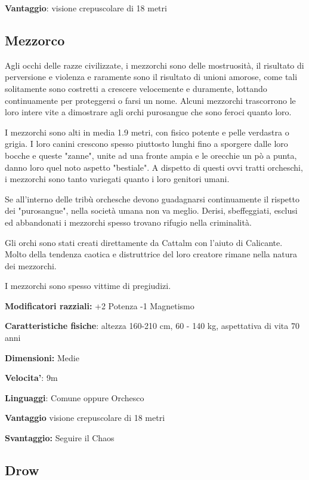 \documentclass[a4paper,11pt,twoside,openany]{book}
\begin{document}
\textbf{Vantaggio}: visione crepuscolare di 18 metri


\subsection{Mezzorco}

\label{mezzorco}

Agli occhi delle razze civilizzate, i mezzorchi sono delle mostruosità, il risultato di perversione e violenza e raramente sono il risultato di unioni amorose, come tali solitamente sono costretti a crescere velocemente e duramente, lottando continuamente per proteggersi o farsi un nome. Alcuni mezzorchi trascorrono le loro intere vite a dimostrare agli orchi purosangue che sono feroci quanto loro.

I mezzorchi sono alti in media 1.9 metri, con fisico potente e pelle verdastra o grigia. I loro canini crescono spesso piuttosto lunghi fino a sporgere dalle loro bocche e queste "zanne", unite ad una fronte ampia e le orecchie un pò a punta, danno loro quel noto aspetto "bestiale". A dispetto di questi ovvi tratti orcheschi, i mezzorchi sono tanto variegati quanto i loro genitori umani.

Se all'interno delle tribù orchesche devono guadagnarsi continuamente il rispetto dei "purosangue", nella società umana non va meglio. Derisi, sbeffeggiati, esclusi ed abbandonati i mezzorchi spesso trovano rifugio nella criminalità.

Gli orchi sono stati creati direttamente da Cattalm con l'aiuto di Calicante. Molto della tendenza caotica e distruttrice del loro creatore rimane nella natura dei mezzorchi.

I mezzorchi sono spesso vittime di pregiudizi.

\textbf{Modificatori razziali:} +2 Potenza -1 Magnetismo

\textbf{Caratteristiche fisiche}: altezza 160-210 cm, 60 - 140 kg,
aspettativa di vita 70 anni

\textbf{Dimensioni:} Medie

\textbf{Velocita'}: 9m

\textbf{Linguaggi}: Comune oppure Orchesco

\textbf{Vantaggio} visione crepuscolare di 18 metri

\textbf{Svantaggio:} Seguire il Chaos

\subsection{Drow}
\end{document}
